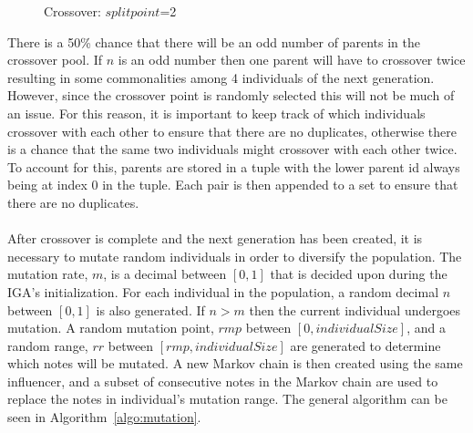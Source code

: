 \documentclass[12pt]{article} %
\begin{document}
\begin{figure}[H]
\caption{Crossover: $split point$=2}
\label{fig:crossover_ex}
\end{figure}

There is a 50\% chance that there will be an odd number of parents in the crossover pool. If $n$ is an odd number then one parent will have to crossover twice resulting in some commonalities among 4 individuals of the next generation. However, since the crossover point is randomly selected this will not be much of an issue. For this reason, it is important to keep track of which individuals crossover with each other to ensure that there are no duplicates, otherwise there is a chance that the same two individuals might crossover with each other twice. To account for this, parents are stored in a tuple with the lower parent id always being at index 0 in the tuple. Each pair is then appended to a set to ensure that there are no duplicates. \\
\\
After crossover is complete and the next generation has been created, it is necessary to mutate random individuals in order to diversify the population. The mutation rate, $m$, is a decimal between $[0,1]$ that is decided upon during the IGA's initialization. For each individual in the population, a random decimal $n$ between $[0,1]$ is also generated. If $n > m$ then the current individual undergoes mutation. A random mutation point, $rmp$ between $[0, individualSize]$, and a random range, $rr$ between $[rmp,individualSize]$ are generated to determine which notes will be mutated. A new Markov chain is then created using the same influencer, and a subset of consecutive notes in the Markov chain are used to replace the notes in individual's mutation range. The general algorithm can be seen in Algorithm~\ref{algo:mutation}.
\end{document}
